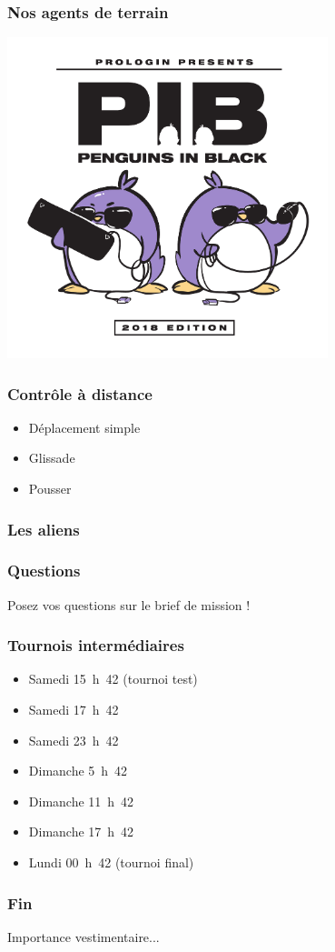 \documentclass{beamer}
\begin{document}
\begin{frame}
    \frametitle{Nos agents de terrain}
    \begin{center}
        \includegraphics[width=0.7\textwidth]{../logofinale}
    \end{center}
\end{frame}

\begin{frame}
    \frametitle{Contrôle à distance}
    \begin{itemize}
        \item Déplacement simple
        \item Glissade
        \item Pousser
    \end{itemize}
\end{frame}

\begin{frame}
    \frametitle{Les aliens}
\end{frame}

\begin{frame}
    \frametitle{Questions}
    Posez vos questions sur le brief de mission !
\end{frame}

\begin{frame}
    \frametitle{Tournois intermédiaires}
    \begin{itemize}
        \item Samedi 15~h~42 (tournoi test)
        \item Samedi 17~h~42
        \item Samedi 23~h~42
        \item Dimanche 5~h~42
        \item Dimanche 11~h~42
        \item Dimanche 17~h~42
        \item Lundi 00~h~42 (tournoi final)
    \end{itemize}
\end{frame}

\begin{frame}
    \frametitle{Fin}
    Importance vestimentaire...
\end{frame}
\end{document}
